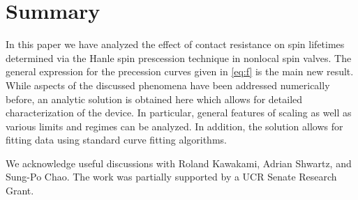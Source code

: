 \section{Summary}
\label{s:summary}

In this paper we have analyzed the effect of contact resistance
on spin lifetimes determined via the Hanle spin prescession technique in nonlocal spin valves.
The general expression for the precession curves given in \cref{eq:f} is the main new result.
While aspects of the discussed phenomena have been addressed numerically before,
an analytic solution is obtained here which allows for detailed characterization of the device.
In particular, general features of scaling as well as various limits and regimes can be analyzed.
In addition, the solution allows for fitting data using standard curve fitting algorithms.

We acknowledge useful discussions with Roland Kawakami, Adrian Shwartz, and Sung-Po Chao.
The work was partially supported by a UCR Senate Research Grant.
